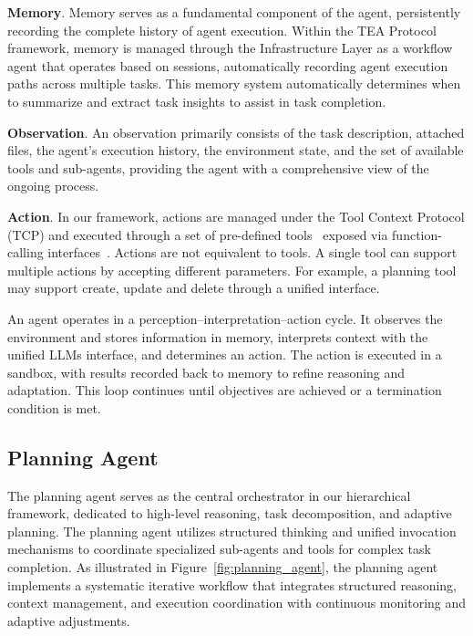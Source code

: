 \documentclass[11pt]{article}
\begin{document}
\textbf{Memory}. Memory serves as a fundamental component of the agent, persistently recording the complete history of agent execution. Within the TEA Protocol framework, memory is managed through the Infrastructure Layer as a workflow agent that operates based on sessions, automatically recording agent execution paths across multiple tasks. This memory system automatically determines when to summarize and extract task insights to assist in task completion.

\textbf{Observation}. An observation primarily consists of the task description, attached files, the agent’s execution history, the environment state, and the set of available tools and sub-agents, providing the agent with a comprehensive view of the ongoing process.

\textbf{Action}. In our framework, actions are managed under the Tool Context Protocol (TCP) and executed through a set of pre-defined tools~\cite{wang2024openhands,openmanus2025,smolagents2025} exposed via function-calling interfaces~\cite{openai2023functioncalling,anthropic2024mcp}. Actions are not equivalent to tools. A single tool can support multiple actions by accepting different parameters. For example, a planning tool may support create, update and delete through a unified interface.

An agent operates in a perception–interpretation–action cycle. It observes the environment and stores information in memory, interprets context with the unified LLMs interface, and determines an action. The action is executed in a sandbox, with results recorded back to memory to refine reasoning and adaptation. This loop continues until objectives are achieved or a termination condition is met.

\subsection{Planning Agent}

The planning agent serves as the central orchestrator in our hierarchical framework, dedicated to high-level reasoning, task decomposition, and adaptive planning. The planning agent utilizes structured thinking and unified invocation mechanisms to coordinate specialized sub-agents and tools for complex task completion. As illustrated in Figure~\ref{fig:planning_agent}, the planning agent implements a systematic iterative workflow that integrates structured reasoning, context management, and execution coordination with continuous monitoring and adaptive adjustments.
\end{document}

